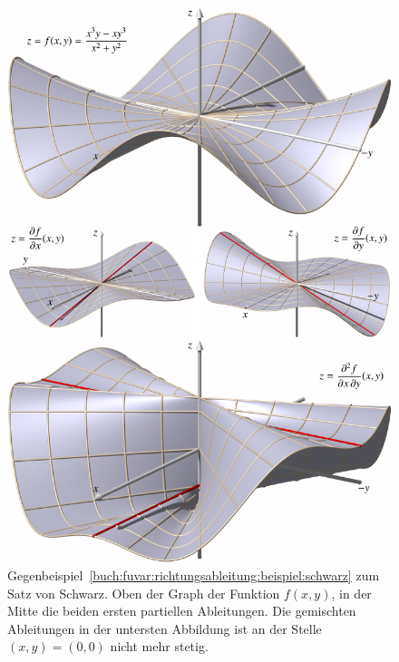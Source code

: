 %
%
%
\begin{figure}
\centering
\includegraphics{chapters/010-fuvar/images/schwarz.pdf}
\caption{Gegenbeispiel~\ref{buch:fuvar:richtungsableitung:beispiel:schwarz}
zum Satz von Schwarz.
Oben der Graph der Funktion $f(x,y)$, in der Mitte die beiden 
ersten partiellen Ableitungen.
Die gemischten Ableitungen in der untersten Abbildung ist an der
Stelle $(x,y)=(0,0)$ nicht mehr stetig.
\label{buch:fuvar:richtungsableitung:fig:schwarz}}
\end{figure}
